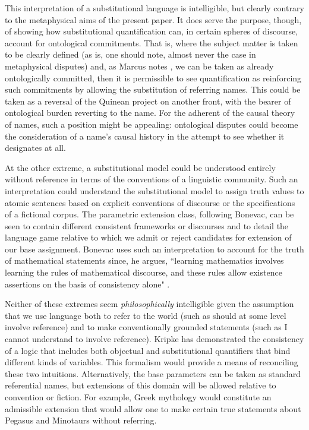 \documentclass[12pt,letterpaper]{article}
\begin{document}
\begin{doublespace}
This interpretation of a substitutional language is intelligible, but
clearly contrary to the metaphysical aims of the present paper.  It
does serve the purpose, though, of showing how substitutional
quantification can, in certain spheres of discourse, account for
ontological commitments.  That is, where the subject matter is taken
to be clearly defined (as is, one should note, almost never the case
in metaphysical disputes) and, as Marcus notes \cite{marcus72}, we can
be taken as already ontologically committed, then it is permissible to
see quantification as reinforcing such commitments by allowing the
substitution of referring names. This could be taken as a reversal of
the Quinean project on another front, with the bearer of ontological
burden reverting to the name.  For the adherent of the causal theory
of names, such a position might be appealing: ontological disputes
could become the consideration of a name's causal history in the
attempt to see whether it designates at all.

At the other extreme, a substitutional model could be understood
entirely without reference in terms of the conventions of a linguistic
community.  Such an interpretation could understand the substitutional
model to assign truth values to atomic sentences based on explicit
conventions of discourse or the specifications of a fictional corpus.
The parametric extension class, following Bonevac, can be seen to
contain different consistent frameworks or discourses and to detail
the language game relative to which we admit or reject candidates for
extension of our base assignment.  Bonevac uses such an
interpretation to account for the truth of mathematical statements
since, he argues, ``learning mathematics involves learning the rules
of mathematical discourse, and these rules allow existence assertions
on the basis of consistency alone" \cite[p.650]{bonevac84}.

Neither of these extremes seem \emph{philosophically} intelligible
given the assumption that we use language both to refer to the world
(such as should at some level involve reference) and to make
conventionally grounded statements (such as I cannot understand to
involve reference).  Kripke \cite{kripke} has demonstrated the
consistency of a logic that includes both objectual and substitutional
quantifiers that bind different kinds of variables. This formalism
would provide a means of reconciling these two intuitions.
Alternatively, the base parameters can be taken as standard
referential names, but extensions of this domain will be allowed
relative to convention or fiction.  For example, Greek mythology would
constitute an admissible extension that would allow one to make
certain true statements about Pegasus and Minotaurs without referring.


\end{doublespace}
\end{document}
